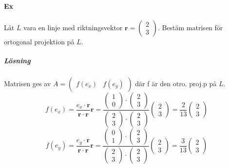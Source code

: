 \paragraph{Ex} Låt $L$ vara en linje med riktningsvektor $\bm{r}=\begin{pmatrix}2\\3\end{pmatrix}$.
Bestäm matrisen för ortogonal projektion på $L$.
\subparagraph{Lösning} Matrisen ges av $A=\begin{pmatrix}f(e_{x})&f(e_{y})\end{pmatrix}$ där f är den otro. proj.p på $L$.
\begin{equation*}
    f(e_{x})=\frac{e_{x}\cdot \bm{r}}{\bm{r}\cdot \bm{r}}\bm{r}=\frac{\begin{pmatrix}1\\0\end{pmatrix}\cdot \begin{pmatrix}2\\3\end{pmatrix}}{\begin{pmatrix}2\\3\end{pmatrix}\cdot\begin{pmatrix}2\\3\end{pmatrix}}\begin{pmatrix}2\\3\end{pmatrix}=\frac{2}{13}\begin{pmatrix}2\\3\end{pmatrix}
\end{equation*}
\begin{equation*}
    f(e_{y})=\frac{e_{y}\cdot \bm{r}}{\bm{r} \cdot \bm{r}}\bm{r}=\frac{\begin{pmatrix}0\\1\end{pmatrix}\cdot \begin{pmatrix}2\\3\end{pmatrix}}{\begin{pmatrix}2\\3\end{pmatrix}\cdot\begin{pmatrix}2\\3\end{pmatrix}}\begin{pmatrix}2\\3\end{pmatrix}=\frac{3}{13}\begin{pmatrix}2\\3\end{pmatrix}
\end{equation*}

